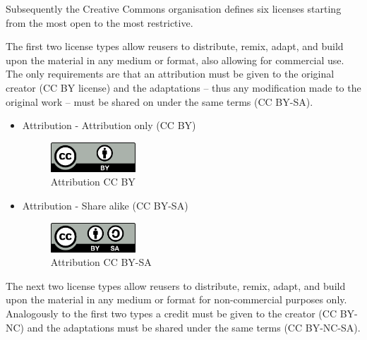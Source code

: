 Subsequently the Creative Commons organisation defines six licenses starting from the most open to the most restrictive.

The first two license types allow reusers to distribute, remix, adapt, and build upon the material in any medium or format, also allowing for commercial use. The only requirements are that an attribution must be given to the original creator (CC BY license) and the adaptations – thus any modification made to the original work – must be shared on under the same terms (CC BY-SA).

\begin{itemize}
  \item Attribution - Attribution only (CC BY)
    \begin{figure}[H]
    \centering
    \includegraphics[width=0.3\textwidth]{images/by.png}
    \caption{Attribution CC BY}
    \label{fig:ccBY}
    \end{figure}
    
    \item Attribution - Share alike (CC BY-SA)
    
    \begin{figure}[H]
    \centering
    \includegraphics[width=0.3\textwidth]{images/by-sa.png}
    \caption{Attribution CC BY-SA}
    \label{fig:ccBYSA}
    \end{figure}
 \end{itemize}
 
The next two license types allow reusers to distribute, remix, adapt, and build upon the material in any medium or format for non-commercial purposes only. Analogously to the first two types a credit must be given to the creator (CC BY-NC) and the adaptations must be shared under the same terms (CC BY-NC-SA).


